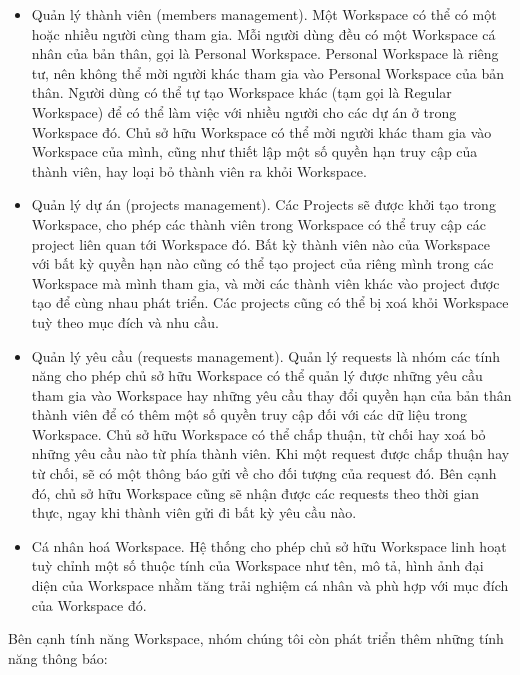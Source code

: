 \begin{itemize}
    \item Quản lý thành viên (members management). Một Workspace có thể có một hoặc nhiều
          người cùng tham gia. Mỗi người dùng đều có một Workspace cá nhân của bản thân,
          gọi là Personal Workspace. Personal Workspace là riêng tư, nên không thể mời
          người khác tham gia vào Personal Workspace của bản thân. Người dùng có thể tự
          tạo Workspace khác (tạm gọi là Regular Workspace) để có thể làm việc với nhiều
          người cho các dự án ở trong Workspace đó. Chủ sở hữu Workspace có thể mời người
          khác tham gia vào Workspace của mình, cũng như thiết lập một số quyền hạn truy
          cập của thành viên, hay loại bỏ thành viên ra khỏi Workspace.
    \item Quản lý dự án (projects management). Các Projects sẽ được khởi tạo trong
          Workspace, cho phép các thành viên trong Workspace có thể truy cập các project
          liên quan tới Workspace đó. Bất kỳ thành viên nào của Workspace với bất kỳ
          quyền hạn nào cũng có thể tạo project của riêng mình trong các Workspace mà
          mình tham gia, và mời các thành viên khác vào project được tạo để cùng nhau
          phát triển. Các projects cũng có thể bị xoá khỏi Workspace tuỳ theo mục đích và
          nhu cầu.
    \item Quản lý yêu cầu (requests management). Quản lý requests là nhóm các tính năng
          cho phép chủ sở hữu Workspace có thể quản lý được những yêu cầu tham gia vào
          Workspace hay những yêu cầu thay đổi quyền hạn của bản thân thành viên để có
          thêm một số quyền truy cập đối với các dữ liệu trong Workspace. Chủ sở hữu
          Workspace có thể chấp thuận, từ chối hay xoá bỏ những yêu cầu nào từ phía thành
          viên. Khi một request được chấp thuận hay từ chối, sẽ có một thông báo gửi về
          cho đối tượng của request đó. Bên cạnh đó, chủ sở hữu Workspace cũng sẽ nhận
          được các requests theo thời gian thực, ngay khi thành viên gửi đi bất kỳ yêu
          cầu nào.
    \item Cá nhân hoá Workspace. Hệ thống cho phép chủ sở hữu Workspace linh hoạt tuỳ
          chỉnh một số thuộc tính của Workspace như tên, mô tả, hình ảnh đại diện của
          Workspace nhằm tăng trải nghiệm cá nhân và phù hợp với mục đích của Workspace
          đó.
\end{itemize}
\par
Bên cạnh tính năng Workspace, nhóm chúng tôi còn phát triển thêm những tính năng thông báo:
